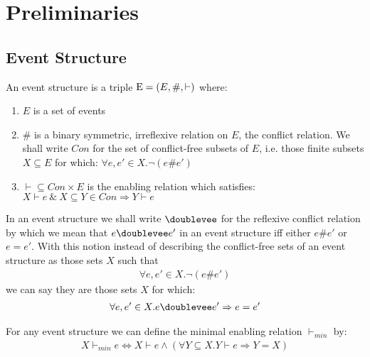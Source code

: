 \section{Preliminaries}
\subsection{Event Structure \cite{es}}
\begin{definition}
    An event structure is a triple $\mathrm{E} = (E,\#,\vdash)$ where:
    \begin{enumerate}
        \item $E$ is a set of events
        \item \# is a binary symmetric, irreflexive relation on $E$,
              the conflict relation.
              We shall write $Con$ for the set of conflict-free subsets of $E$,
              i.e. those finite subsets $X \subseteq E$ for which:
              $\forall e,e' \in X . \neg (e\#e')$
        \item $\vdash \subseteq Con \times E$ is the enabling relation which satisfies:
              $ X \vdash e \ \& \ X \subseteq Y \in Con \Rightarrow Y \vdash e$
    \end{enumerate}

\end{definition}
\begin{notion}
    In an event structure we shall write $\doublevee$ for the reflexive conflict relation by which we mean
    that $e\doublevee e'$ in an event structure iff either $e\#e'$ or $e=e'$.
    With this notion instead of describing the conflict-free sets of an event structure
    as those sets $X$ such that
    \begin{align*}
        \forall e,e' \in X. \neg(e\#e')
    \end{align*}
    we can say they are those sets $X$ for which:
    \begin{align*}
        \forall e,e' \in X. e\doublevee e' \Rightarrow e=e'
    \end{align*}
\end{notion}

\begin{notion}
    For any event structure we can define the minimal enabling relation $\vdash_{min}$ by:
    \begin{align*}
        X \vdash_{min} e \iff X \vdash e \wedge
        ( \forall Y \subseteq X . Y \vdash e \Rightarrow Y = X )
    \end{align*}
\end{notion}

